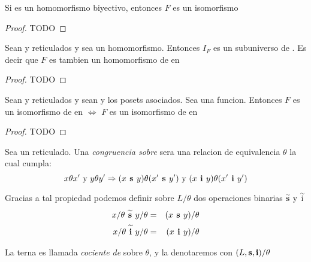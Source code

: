 \begin{lemma}
  Si  es un homomorfismo biyectivo,
  entonces $F$ es un isomorfismo
\end{lemma}
\begin{proof}
  TODO
\end{proof}
\begin{lemma}
  Sean \reticulAlg y  reticulados y sea 
  un homomorfismo. Entonces $I_F$ es un subuniverso de . Es decir que $F$
  es tambien un homomorfismo de \reticulAlg en 
\end{lemma}
\begin{proof}
  TODO
\end{proof}
\begin{lemma}
  Sean \reticulAlg y  reticulados y sean  y 
  los posets asociados. Sea  una funcion. Entonces $F$ es un isomorfismo de
  \reticulAlg en  $\iff$ $F$ es un isomorfismo de  en 
\end{lemma}
\begin{proof}
  TODO
\end{proof}
\begin{definition}
  Sea \reticulAlg un reticulado. Una \emph{congruencia sobre} \reticulAlg sera una relacion de equivalencia
  $\theta$ la cual cumpla:
  $$
  x\theta x' \text{ y } y\theta y' \Rightarrow (x\textbf{ s }y)\theta(x'\textbf{ s }y') \text{ y } (x\textbf{ i }y)\theta(x'\textbf{ i }y')
  $$

  Gracias a tal propiedad podemos definir sobre $L/\theta$ dos operaciones binarias $\overset{\sim}{\textbf{s}}$ y $\overset{\sim}{\text{i}}$
  \begin{alignat*}{2}
    x/\theta\overset{\sim}{\textbf{ s }}y/\theta &=& (x\textbf{ s }y)/\theta\\
    x/\theta\overset{\sim}{\textbf{ i }}y/\theta &=& (x\textbf{ i }y)/\theta
  \end{alignat*}
\end{definition}

\begin{definition}
  La terna  es llamada \emph{cociente de} \reticulAlg sobre $\theta$,
  y la denotaremos con $(L, \textbf{s}, \textbf{i})/\theta$
\end{definition}

